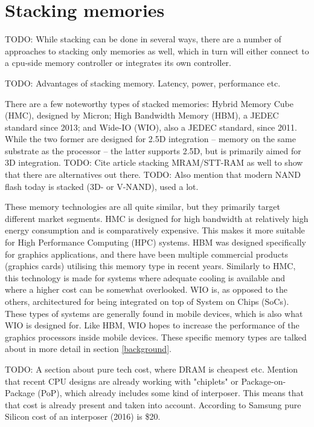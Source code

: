\section{Stacking memories}
TODO: While stacking can be done in several ways, there are a number of approaches to stacking only memories as well, which in turn will either connect to a cpu-side memory controller or integrates its own controller.
\bigskip

TODO: Advantages of stacking memory. Latency, power, performance etc.
\bigskip

There are a few noteworthy types of stacked memories: Hybrid Memory Cube (HMC), designed by Micron; High Bandwidth Memory (HBM), a JEDEC standard since 2013; and Wide-IO (WIO), also a JEDEC standard, since 2011. While the two former are designed for 2.5D integration -- memory on the same substrate as the processor -- the latter supports 2.5D, but is primarily aimed for 3D integration. TODO: Cite article stacking MRAM/STT-RAM as well to show that there are alternatives out there. TODO: Also mention that modern NAND flash today is stacked (3D- or V-NAND), used a lot. 
\bigskip

These memory technologies are all quite similar, but they primarily target different market segments. HMC is designed for high bandwidth at relatively high energy consumption and is comparatively expensive. This makes it more suitable for High Performance Computing (HPC) systems. HBM was designed specifically for graphics applications, and there have been multiple commercial products (graphics cards) utilising this memory type in recent years. Similarly to HMC, this technology is made for systems where adequate cooling is available and where a higher cost can be somewhat overlooked. WIO is, as opposed to the others, architectured for being integrated on top of System on Chips (SoCs). These types of systems are generally found in mobile devices, which is also what WIO is designed for. Like HBM, WIO hopes to increase the performance of the graphics processors inside mobile devices. These specific memory types are talked about in more detail in section \ref{background}.
\bigskip

TODO: A section about pure tech cost, where DRAM is cheapest etc. Mention that recent CPU designs are already working with "chiplets" or Package-on-Package (PoP), which already includes some kind of interposer. This means that that cost is already present and taken into account. According to Samsung pure Silicon cost of an interposer (2016) is \$20.
\bigskip

